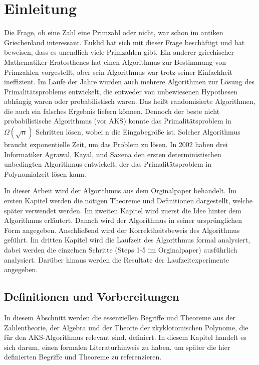 \documentclass[12pt,oneside]{article}
\theoremstyle{remark}
\theoremstyle{definition}
\begin{document}
\section{Einleitung} \label{einleitung}
Die Frage, ob eine Zahl eine Primzahl oder nicht, war schon im antiken Griechenland interessant. Euklid hat sich mit dieser Frage beschäftigt und hat beweisen, dass es unendlich viele Primzahlen gibt. Ein anderer griechischer Mathematiker Eratosthenes hat einen Algorithmus zur Bestimmung von Primzahlen vorgestellt, aber sein Algorithmus war trotz seiner Einfachheit ineffizient. Im Laufe der Jahre wurden auch mehrere Algorithmen zur Lösung des Primalitätsproblems entwickelt, die entweder von unbewiesenen Hypothesen abhängig waren oder probabilistisch waren. Das heißt randomisierte Algorithmen, die auch ein falsches Ergebnis liefern können. Dennoch der beste nicht probabilistische Algorithmus (vor AKS) konnte das Primalitätsproblem in $ \Omega(\sqrt{n}) $ Schritten lösen, wobei n die Eingabegröße ist. Solcher Algorithmus braucht exponentielle Zeit, um das Problem zu lösen. In 2002 haben drei Informatiker Agrawal, Kayal, und Saxena den ersten deterministischen unbedingten Algorithmus entwickelt, der das Primalitätsproblem in Polynomialzeit lösen kann.\newline

In dieser Arbeit wird der Algorithmus aus dem Orginalpaper behandelt. Im ersten Kapitel werden die nötigen Theoreme und Definitionen dargestellt, welche später verwendet werden. Im zweiten Kapitel wird zuerst die Idee hinter dem Algorithmus erläutert. Danach wird der Algorithmus in seiner ursprünglichen Form angegeben. Anschließend wird der Korrektheitsbeweis des Algorithmus geführt. Im dritten Kapitel wird die Laufzeit des Algorithmus formal analysiert, dabei werden die einzelnen Schritte (Steps 1-5 im Orginalpaper) ausführlich analysiert. Darüber hinaus werden die Resultate der Laufzeitexperimente angegeben.    

\subsection{Definitionen und Vorbereitungen}
In diesem Abschnitt werden die essenziellen Begriffe und Theoreme aus der Zahlentheorie, der Algebra und der Theorie der zkyklotomischen Polynome, die für den AKS-Algorithmus relevant sind, definiert. In diesem Kapitel handelt es sich darum, einen formalen Literaturhinweis zu haben, um später die hier definierten Begriffe und Theoreme zu referenzieren.
\end{document}
